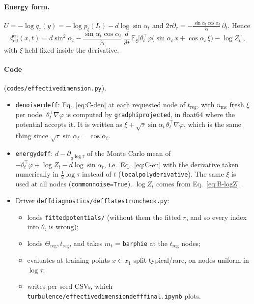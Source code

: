 \documentclass[11pt]{article}
\newcommand{\E}{\mathbb{E}}
\newcommand{\code}[1]{\texttt{#1}}
\renewcommand{\_}{\origunderscore\allowbreak}
\newcommand{\deff}{d_{\mathrm{eff}}}
\begin{document}
\paragraph{Energy form.} $U=-\log q_\tau(y)=-\log p_t(I_t)-d\log\sin\alpha_t$ and
$2\tau\partial_\tau=-\frac{\sin\alpha_t\cos\alpha_t}{\dot\alpha}\,\partial_t$. Hence
\begin{equation}
  \deff^{\mathrm{en}}(x,t)=d\sin^2\!\alpha_t-\frac{\sin\alpha_t\cos\alpha_t}{\dot\alpha}\,
  \frac{d}{dt}\,\E_\xi\Big[\theta_t^\top\varphi\big(\sin\alpha_t\,x+\cos\alpha_t\,\xi\big)-\log Z_t\Big],
  \label{eq:C-en}
\end{equation}
with $\xi$ held fixed inside the derivative.

\paragraph{Code} (\code{codes/effective\_dimension.py}).
\begin{itemize}
\item \code{denoiser\_d\_eff}: Eq.~\ref{eq:C-den} at each requested node of $t_{\mathrm{reg}}$, with $n_{\mathrm{mc}}$ fresh $\xi$
  per node. $\theta_t^\top\nabla\varphi$ is computed by \code{grad\_phi\_projected}, in float64 where
  the potential accepts it. It is written as $\xi+\sqrt\tau\sin\alpha_t\,\theta_t^\top\nabla\varphi$, which is the same thing since
  $\sqrt\tau\sin\alpha_t=\cos\alpha_t$.
\item \code{energy\_d\_eff}: $d-\partial_{\frac12\log\tau}$ of the Monte Carlo mean of
  $-\theta_t^\top\varphi+\log Z_t-d\log\sin\alpha_t$, i.e.\ Eq.~\ref{eq:C-en} with the
  derivative taken numerically in $\tfrac12\log\tau$ instead of $t$
  (\code{local\_poly\_derivative}). The same $\xi$ is used at all nodes (\code{common\_noise=True}).
  $\log Z_t$ comes from Eq.~\ref{eq:B-logZ}.
\item Driver \code{deff\_diagnostics/deff\_latest\_run\_check.py}:
  \begin{itemize}
  \item loads \code{fitted\_potentials/} (without them the fitted $r$, and so every index into $\theta$, is wrong);
  \item loads $\Theta_{\mathrm{reg}},t_{\mathrm{reg}}$, and takes $m_t$ = \code{barphi\_e} at the $t_{\mathrm{reg}}$ nodes;
  \item evaluates at training points $x\in x_1$ split typical/rare, on nodes uniform in $\log\tau$;
  \item writes per-seed CSVs, which \code{turbulence/effective\_dimension\_deff\_final.ipynb} plots.
  \end{itemize}
\end{itemize}
\end{document}
